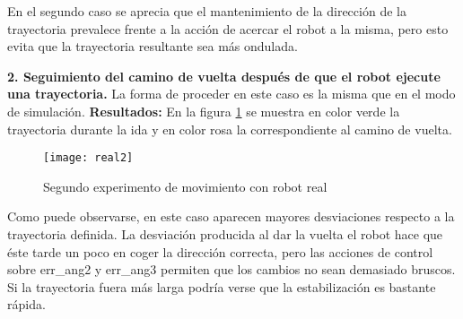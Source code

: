 En el segundo caso se aprecia que el mantenimiento de la dirección de la trayectoria prevalece frente a la acción de acercar el robot a la misma, pero esto evita que la trayectoria resultante sea más ondulada.

\noindent
\textbf{\textbf{2.} Seguimiento del camino de vuelta después de que el robot ejecute una trayectoria.}
La forma de proceder en este caso es la misma que en el modo de simulación.
\textbf{Resultados:}
En la figura \ref{fg:real2} se muestra en color verde la trayectoria durante la ida y en color rosa la correspondiente al camino de vuelta.
\begin{figure}[h]
  \centering\texttt{[image: real2]}\\
  \caption{Segundo experimento de movimiento con robot real}\label{fg:real2}
\end{figure}

Como puede observarse, en este caso aparecen mayores desviaciones respecto a la trayectoria definida. La desviación producida al dar la vuelta el robot hace que éste tarde un poco en coger la dirección correcta, pero las acciones de control sobre err\_ang2 y err\_ang3 permiten que los cambios no sean demasiado bruscos. Si la trayectoria fuera más larga podría verse que la estabilización es bastante rápida.
